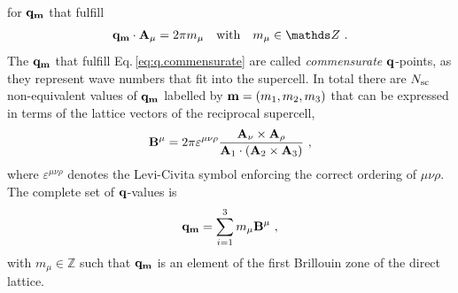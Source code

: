 for ${\bf q}_{{\bf m}}$ that fulfill
\begin{align}
	{\bf q_{\b m}} \cdot {\bf A}_\mu	= 2 \pi m_\mu \quad\text{with}\quad m_\mu \in \mathds Z~.
	\label{eq:q.commensurate}
\end{align}
The ${\bf q}_{{\bf m}}$ that fulfill Eq.\,\eqref{eq:q.commensurate} are called \emph{commensurate} ${\bf q}$-points, as they represent wave numbers that fit into the supercell.
In total there are $N_{\rm sc}$ non-equivalent values of $\bf q_{{\bf m}}$ labelled by ${\bf m} = (m_1, m_2, m_3)$ that can be expressed in terms of the lattice vectors of the reciprocal supercell,
\begin{align}
{\bf B}^\mu
= 2 \pi \varepsilon^{\mu \nu \rho} \frac{{\bf A}_\nu \times {\bf A}_\rho}{{\bf A}_1 \cdot ({\bf A}_2 \times {\bf A}_3)} ~,
\end{align}
where $\varepsilon^{\mu \nu \rho}$ denotes the Levi-Civita symbol enforcing the correct ordering of $\mu \nu \rho$. The complete set of $\bf q$-values is
\begin{align}
{\bf q}_{\bf m} 
= \sum_{i=1}^3 m_\mu {\bf B}^\mu~,
\label{eq:q_m}
\end{align}
with $m_\mu \in \mathds Z$ such that ${\bf q}_{\bf m}$ is an element of the first Brillouin zone of the direct lattice.




